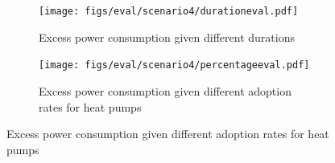 \begin{figure}[htbp!]
    \centering
      \begin{subfigure}{0.45\textwidth}
        \centering
        \texttt{[image: figs/eval/scenario4/durationeval.pdf]}
        \caption{Excess power consumption given different durations}
        \label{warningmessagedifferentdurations}
      \end{subfigure}
      \hfill
      \begin{subfigure}{0.45\textwidth}
        \centering
        \texttt{[image: figs/eval/scenario4/percentageeval.pdf]}
        \caption{Excess power consumption given different adoption 
        rates for heat pumps}
        \label{warningmessagedifferentadoptionrates}
      \end{subfigure}
\end{figure}